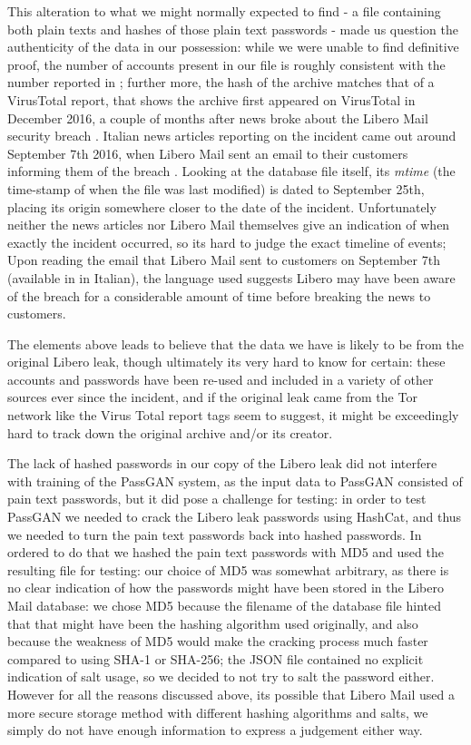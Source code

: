 This alteration to what we might normally expected to find - a file containing both plain texts and hashes of those plain text passwords - made us question the authenticity of the data in our possession: while we were unable to find definitive proof, the number of accounts present in our file is roughly consistent with the number reported in \cite{libero_leak}; further more, the hash of the archive matches that of a VirusTotal report, that shows the archive first appeared on VirusTotal in December 2016, a couple of months after news broke about the Libero Mail security breach \cite{virus_total}.
Italian news articles reporting on the incident came out around September 7th 2016, when Libero Mail sent an email to their customers informing them of the breach \cite{libero-news-wired,libero-news-tomhw,libero-news-fanpage}.
Looking at the database file itself, its \emph{mtime} (the time-stamp of when the file was last modified) is dated to September 25th, placing its origin somewhere closer to the date of the incident. Unfortunately neither the news articles nor Libero Mail themselves give an indication of when exactly the incident occurred, so its hard to judge the exact timeline of events; Upon reading the email that Libero Mail sent to customers on September 7th (available in \cite{libero-news-fanpage} in Italian), the language used suggests Libero may have been aware of the breach for a considerable amount of time before breaking the news to customers.

The elements above leads to believe that the data we have is likely to be from the original Libero leak, though ultimately its very hard to know for certain: these accounts and passwords have been re-used and included in a variety of other sources ever since the incident, and if the original leak came from the Tor network like the Virus Total report tags seem to suggest, it might be exceedingly hard to track down the original archive and/or its creator.

The lack of hashed passwords in our copy of the Libero leak did not interfere with training of the PassGAN system, as the input data to PassGAN consisted of pain text passwords, but it did pose a challenge for testing: in order to test PassGAN we needed to crack the Libero leak passwords using HashCat, and thus we needed to turn the pain text passwords back into hashed passwords.
In ordered to do that we hashed the pain text passwords with MD5 and used the resulting file for testing: our choice of MD5 was somewhat arbitrary, as there is no clear indication of how the passwords might have been stored in the Libero Mail database: we chose MD5 because the filename of the database file hinted that that might have been the hashing algorithm used originally, and also because the weakness of MD5 would make the cracking process much faster compared to using SHA-1 or SHA-256; the JSON file contained no explicit indication of salt usage, so we decided to not try to salt the password either. 
However for all the reasons discussed above, its possible that Libero Mail used a more secure storage method with different hashing algorithms and salts, we simply do not have enough information to express a judgement either way.

